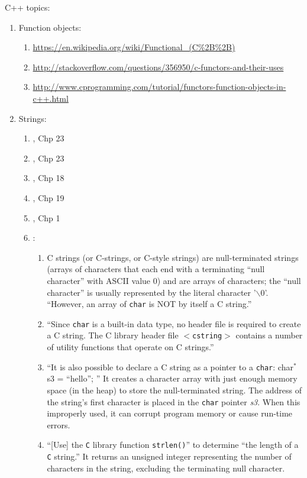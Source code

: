 C++ topics: \vspace{-0.3cm}
\begin{enumerate} \itemsep -4pt
\item Function objects: \vspace{-0.3cm}
	\begin{enumerate} \itemsep -2pt
	\item \url{https://en.wikipedia.org/wiki/Functional_(C%2B%2B)}
	\item \url{http://stackoverflow.com/questions/356950/c-functors-and-their-uses}
	\item \url{http://www.cprogramming.com/tutorial/functors-function-objects-in-c++.html}
	\end{enumerate}
\item Strings: \vspace{-0.3cm}
	\begin{enumerate} \itemsep -2pt
	\item \cite{Stroustrup2014}, Chp 23
	\item \cite{Stroustrup2009}, Chp 23
	\item \cite{Gregoire2014}, Chp 18
	\item \cite{Allain2012}, Chp 19
	\item \cite{Eckel2003}, Chp 1
	\item \cite{McMahon20XY}: \vspace{-0.2cm}
		\begin{enumerate} \itemsep -2pt
		\item C strings (or C-strings, or C-style strings) are null-terminated strings (arrays of characters that each end with a terminating ``null character'' with ASCII value 0) and are arrays of characters; the ``null character'' is usually represented by the literal character '$\backslash$0'. ``However, an array of {\tt char} is NOT by itself a C string.''
		\item ``Since {\tt char} is a built-in data type, no header file is required to create a C string. The C library header file $<${\tt cstring}$>$ contains a number of utility functions that operate on C strings.''
		\item ``It is also possible to declare a C string as a pointer to a {\tt char}: char$^{\ast}$ s3 = ``hello''; '' It creates a character array with just enough memory space (in the heap) to store the null-terminated string. The address of the string's first character is placed in the {\tt char} pointer {\it s3}. When this improperly used, it can corrupt program memory or cause run-time errors.
		\item ``[Use] the {\tt C} library function {\tt strlen()}'' to determine ``the length of a {\tt C} string.'' It returns an unsigned integer representing the number of characters in the string, excluding the terminating null character.

\end{enumerate}
\end{enumerate}
\end{enumerate}
